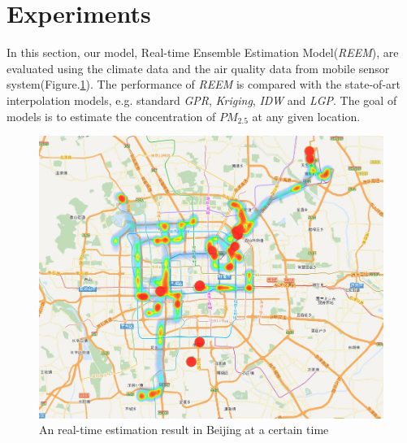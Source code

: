 \documentclass[twoside,leqno,twocolumn]{article}
\begin{document}

\section{Experiments}
In this section, our model, Real-time Ensemble Estimation Model(\emph{REEM}), are evaluated using the climate data and the air quality data from mobile sensor system(Figure.\ref{fig:display}). The performance of \emph{REEM} is compared with the state-of-art interpolation models, e.g. standard \emph{GPR}, \emph{Kriging}, \emph{IDW} and \emph{LGP}. The goal of models is to estimate the concentration of $PM_{2.5}$ at any given location.
\begin{figure}[!htb]
\centerline{
\includegraphics[width=0.68\linewidth]{pictures/display.png}
}
\caption{\label{fig:display}An real-time estimation result in Beijing at a certain time}
\end{figure}
\end{document}

